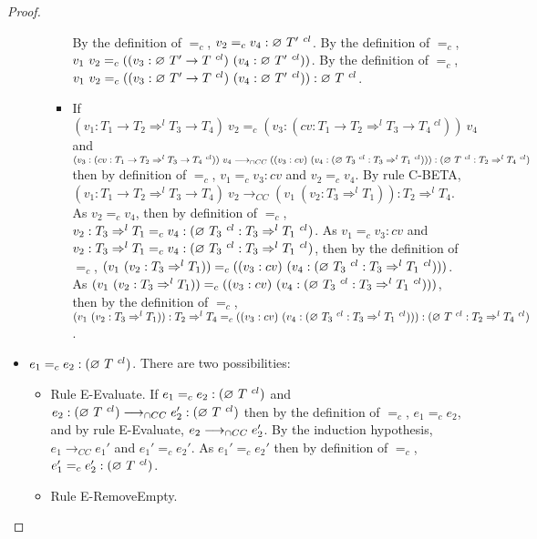 \documentclass[a4paper]{article}
\begin{document}
\begin{proof}
\begin{itemize}
\begin{itemize}
\begin{itemize}
            By the definition of $=_c$, $v_2 =_c v_4 : \varnothing\ T'\ ^{cl}$.
            By the definition of $=_c$, $v_1\ v_2 =_c ((v_3 : \varnothing\ T' \rightarrow T\ ^{cl})\ (v_4 : \varnothing\ T'\ ^{cl}))$.
            By the definition of $=_c$, $v_1\ v_2 =_c ((v_3 : \varnothing\ T' \rightarrow T\ ^{cl})\ (v_4 : \varnothing\ T'\ ^{cl})) : \varnothing\ T\ ^{cl}$.
            \item If $(v_1 : T_1 \rightarrow T_2 \Rightarrow^l T_3 \rightarrow T_4)\ v_2 =_c (v_3 : (cv : T_1 \rightarrow T_2 \Rightarrow^l T_3 \rightarrow T_4\ ^{cl}))\ v_4$ and $(v_3 : (cv : T_1 \rightarrow T_2 \Rightarrow^l T_3 \rightarrow T_4\ ^{cl}))\ v_4 \longrightarrow_{\cap CC} ((v_3 : cv)\ (v_4 : (\varnothing\ T_3\ ^{cl} : T_3 \Rightarrow^l T_1\ ^{cl}))) : (\varnothing\ T\ ^{cl} : T_2 \Rightarrow^l T_4\ ^{cl})$ then by definition of $=_c$, $v_1 =_c v_3 : cv$ and $v_2 =_c v_4$.
            By rule C-BETA, $(v_1 : T_1 \rightarrow T_2 \Rightarrow^l T_3 \rightarrow T_4)\ v_2 \longrightarrow_{CC} (v_1\ (v_2 : T_3 \Rightarrow^l T_1)) : T_2 \Rightarrow^l T_4$.
            As $v_2 =_c v_4$, then by definition of $=_c$, $v_2 : T_3 \Rightarrow^l T_1 =_c v_4 : (\varnothing\ T_3\ ^{cl} : T_3 \Rightarrow^l T_1\ ^{cl})$.
            As $v_1 =_c v_3 : cv$ and $v_2 : T_3 \Rightarrow^l T_1 =_c v_4 : (\varnothing\ T_3\ ^{cl} : T_3 \Rightarrow^l T_1\ ^{cl})$, then by the definition of $=_c$, $(v_1\ (v_2 : T_3 \Rightarrow^l T_1)) =_c ((v_3 : cv)\ (v_4 : (\emptycast{T_3}{cl} : T_3 \Rightarrow^l T_1\ ^{cl})))$.
            As $(v_1\ (v_2 : T_3 \Rightarrow^l T_1)) =_c ((v_3 : cv)\ (v_4 : (\emptycast{T_3}{cl} : T_3 \Rightarrow^l T_1\ ^{cl})))$, then by the definition of $=_c$, $(v_1\ (v_2 : T_3 \Rightarrow^l T_1)) : T_2 \Rightarrow^l T_4 =_c ((v_3 : cv)\ (v_4 : (\varnothing\ T_3\ ^{cl} : T_3 \Rightarrow^l T_1\ ^{cl}))) : (\varnothing\ T\ ^{cl} : T_2 \Rightarrow^l T_4\ ^{cl})$.
        \end{itemize}
    \end{itemize}
    \item $e_1 =_c e_2 : (\varnothing\ T\ ^{cl})$.
    There are two possibilities:
    \begin{itemize}
        \item Rule E-Evaluate.
        If $e_1 =_c e_2 : (\varnothing\ T\ ^{cl})$ and $e_2 : (\varnothing\ T\ ^{cl}) \longrightarrow_{\cap CC} e_2' : (\varnothing\ T\ ^{cl})$ then by the definition of $=_c$, $e_1 =_c e_2$, and by rule E-Evaluate, $e_2 \longrightarrow_{\cap CC} e_2'$.
        By the induction hypothesis, $e_1 \longrightarrow_{CC} e_1'$ and $e_1' =_c e_2'$.
        As $e_1' =_c e_2'$ then by definition of $=_c$, $e_1' =_c e_2' : (\varnothing\ T\ ^{cl})$.
        \item Rule E-RemoveEmpty.

\end{itemize}
\end{itemize}
\end{proof}
\end{document}

